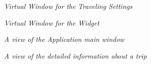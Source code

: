 \begin{figure}
\begin{center}
  \caption{\emph{Virtual Window for the Traveling Settings}} \label{pic:vwSettings}
\end{center}    
\end{figure}


\begin{figure}
\begin{center}
  \caption{\emph{Virtual Window for the Widget}} \label{pic:vwWidget}
\end{center}    
\end{figure}


\begin{figure}
\begin{center}
  \caption{\emph{A view of the Application main window}} \label{pic:Application}
\end{center}    
\end{figure}


\begin{figure}
\begin{center}
  \caption{\emph{A view of the detailed information about a trip}} \label{pic:TripInformation}
\end{center}    
\end{figure}


